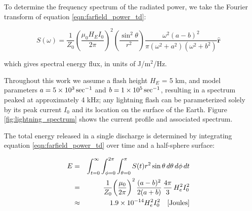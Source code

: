 To determine the frequency spectrum of the radiated power, we take the Fourier transform of equation \ref{eqn:farfield_power_td}:

\begin{equation}
\label{eqn:farfield_power_fd}
S(\omega) = \frac{1}{Z_0}\left(\frac{\mu_0 H_E I_0}{2 \pi}\right)^2\left(\frac{\sin^2\theta}{r^2}\right) \frac{\omega^2(a-b)^2}{\pi(\omega^2 + a^2)(\omega^2 + b^2)}  \mathbf{\hat{r}}
\end{equation}

which gives spectral energy flux, in units of J/m$^2$/Hz.

Throughout this work we assume a flash height $H_E$ = 5 km, and model parameters $a=5\times 10^{3}\,\mathrm{sec}^{-1}$ and $b=1\times 10^{5}\,\mathrm{sec}^{-1}$, resulting in a spectrum peaked at approximately 4 kHz; any lightning flash can be parameterized solely by its peak current $I_0$ and its location on the surface of the Earth. Figure \ref{fig:lightning_spectrum} shows the current profile and associated spectrum.

The total energy released in a single discharge is determined by integrating equation \ref{eqn:farfield_power_td} over time and a half-sphere surface:

\begin{eqnarray}
\label{eqn:total_energy_below_iono}
E &= &\int_{t=0}^\infty \int_{\phi=0}^{2\pi} \int_{\theta=0}^\pi  S(t) r^2 \sin\theta\,d\theta\,d\phi\,dt \\
 & = & \frac{1}{Z_0}\bigg(\frac{\mu_0}{2\pi}\bigg)^2 \, \frac{(a - b)^2}{2 (a + b)}  \, \frac{4 \pi}{3} \, H_e^2 I_0^2 \\
 & \approx & 1.9\times 10^{-14}H_e^2 I_0^2 \quad[\mathrm{Joules}]
\end{eqnarray}



